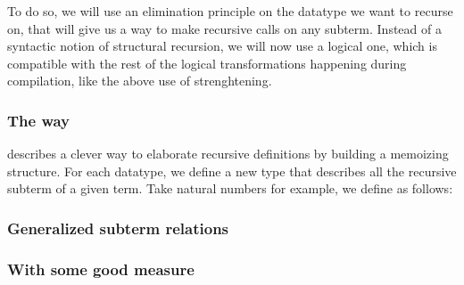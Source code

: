 To do so, we will use an elimination principle on the datatype we want
to recurse on, that will give us a way to make recursive calls on any
subterm. Instead of a syntactic notion of structural recursion, we will now use a
logical one, which is compatible with the rest of the logical
transformations happening during compilation, like the above use of
strenghtening.

\subsubsection{The \Below way}

\cite{DBLP:conf/birthday/GoguenMM06} describes a clever way to
elaborate recursive definitions by building a memoizing structure. 
For each datatype, we define a new type  that describes all
the recursive subterm of a given term. Take natural numbers for example,
we define  as follows:



\subsubsection{Generalized subterm relations}

\subsubsection{With some good measure}


